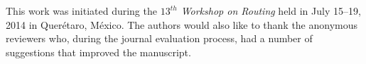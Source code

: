 \documentclass[
final
]{dmtcs-episciences}
\theoremstyle{definition}
\begin{document}
\acknowledgements
\label{sec:ack}
This work was initiated during the \emph{$13^{th}$ Workshop on Routing} held in July 15--19,
2014 in Quer\'{e}taro, M\'{e}xico.
The authors would also like to thank the anonymous reviewers who, during the journal evaluation process, had a number of suggestions that improved the manuscript. 

\nocite{*}


\label{sec:biblio}
\end{document}
